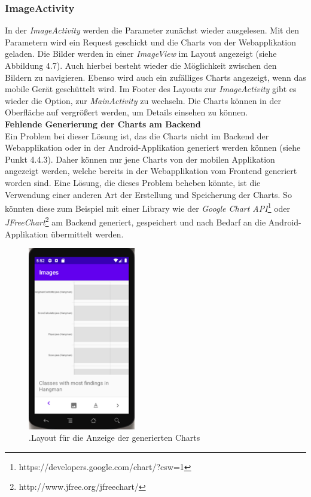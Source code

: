 \subsubsection{ImageActivity}
In der \textit{ImageActivity} werden die Parameter zunächst wieder ausgelesen. Mit den Parametern wird ein Request geschickt und die Charts von der Webapplikation geladen. Die Bilder werden in einer \textit{ImageView} im Layout angezeigt (siehe Abbildung 4.7). Auch hierbei besteht wieder die Möglichkeit zwischen den Bildern zu navigieren. Ebenso wird auch ein zufälliges Charts angezeigt, wenn das mobile Gerät geschüttelt wird. Im Footer des Layouts zur \textit{ImageActivity} gibt es wieder die Option, zur \textit{MainActivity} zu wechseln. Die Charts können in der Oberfläche auf vergrößert werden, um Details einsehen zu können.  \\
\textbf{Fehlende Generierung der Charts am Backend} \\
Ein Problem bei dieser Lösung ist, das die Charts nicht im Backend der Webapplikation oder in der Android-Applikation generiert werden können (siehe Punkt 4.4.3). Daher können nur jene Charts von der mobilen Applikation angezeigt werden, welche bereits in der Webapplikation vom Frontend generiert worden sind. Eine Lösung, die dieses Problem beheben könnte, ist die Verwendung einer anderen Art der Erstellung und Speicherung der Charts. So könnten diese zum Beispiel mit einer Library wie der \textit{Google Chart API}\footnote{https://developers.google.com/chart/?csw=1} oder \textit{JFreeChart}\footnote{http://www.jfree.org/jfreechart/} am Backend generiert, gespeichert und nach Bedarf an die Android-Applikation übermittelt werden.
\begin{figure}[tp]
  \centering
  \includegraphics[height=8cm]{images/androidChart.PNG}
 \caption[Layout für die Anzeige der generierten Charts]{.Layout für die Anzeige der generierten Charts}
  \label{fig:findingsInIDE}
\end{figure}

